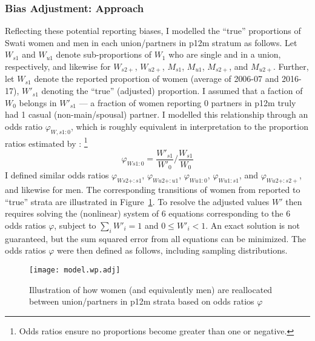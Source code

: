 \subsubsection{Bias Adjustment: Approach}\label{model.par.nsw.bias}
Reflecting these potential reporting biases,
I modelled the ``true'' proportions of Swati women and men
in each union/partners in p12m stratum as follows.
Let $W_{s1}$ and $W_{u1}$ denote sub-proportions of $W_{1}$ who are single and in a union, respectively,
and likewise for $W_{s2+}$, $W_{u2+}$, $M_{s1}$, $M_{u1}$, $M_{s2+}$, and $M_{u2+}$.
Further, let $W_{s1}$ denote the reported proportion of women (average of 2006-07 and 2016-17),
\vs $W'_{s1}$ denoting the ``true'' (adjusted) proportion.
I assumed that a faction of $W_{0}$ belongs in $W'_{s1}$
--- \ie a fraction of women reporting 0 partners in p12m truly had 1 casual (non-main/spousal) partner.
I modelled this relationship through an odds ratio $\varphi_{W,s1:0}$,
which is roughly equivalent in interpretation to
the proportion ratios estimated by \citet{Behanzin2013}:%
\footnote{Odds ratios ensure no proportions become greater than one or negative.}
\begin{equation}\label{eq:Cwp-or}
  \varphi_{Ws1:0} = \frac{W'_{s1}}{W'_{0}} \bigg/ \frac{W_{s1}}{W_{0}}
\end{equation}
I defined similar odds ratios $\varphi_{Ws2+:s1}$, $\varphi_{Wu2+:u1}$,
$\varphi_{Wu1:0}$, $\varphi_{Wu1:s1}$, and $\varphi_{Wu2+:s2+}$, and likewise for men.
The corresponding transitions of women from reported to ``true'' strata
are illustrated in Figure~\ref{fig:model.nsw.adj}.
To resolve the adjusted values $W'$ then requires
solving the (nonlinear) system of 6 equations corresponding to the 6 odds ratios $\varphi$,
subject to $\sum_i W'_i = 1$ and $0 \le W'_i < 1$.
An exact solution is not guaranteed,
but the sum squared error from all equations can be minimized.
The odds ratios $\varphi$ were then defined as follows, including sampling distributions.
\begin{figure}
  \centering
  \texttt{[image: model.wp.adj]}
  \caption{Illustration of how women (and equivalently men)
    are reallocated between union/partners in p12m strata
    based on odds ratios $\varphi$}
  \label{fig:model.nsw.adj}
\end{figure}
